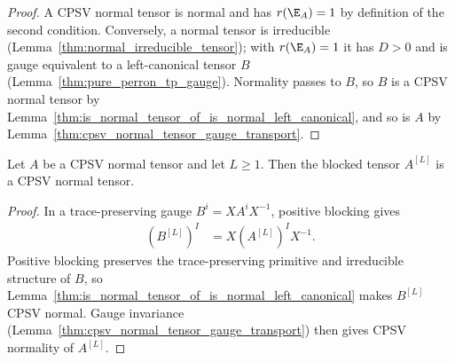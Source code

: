 \begin{proof}\leanok
    A CPSV normal tensor is normal and has $r(\E_A)=1$ by definition of the
    second condition. Conversely, a normal tensor is irreducible
    (Lemma~\ref{thm:normal_irreducible_tensor}); with $r(\E_A)=1$ it has
    $D>0$ and is gauge equivalent to a left-canonical tensor $B$
    (Lemma~\ref{thm:pure_perron_tp_gauge}). Normality passes to $B$, so $B$ is a
    CPSV normal tensor by
    Lemma~\ref{thm:is_normal_tensor_of_is_normal_left_canonical}, and so is $A$
    by Lemma~\ref{thm:cpsv_normal_tensor_gauge_transport}.
\end{proof}

\begin{lemma}
    \label{thm:cpsv_normal_tensor_positive_blocking}
    \leanok
    Let $A$ be a CPSV normal tensor and let $L\geq1$. Then the blocked tensor
    $A^{[L]}$ is a CPSV normal tensor.
\end{lemma}

\begin{proof}\leanok
    In a trace-preserving gauge $B^i=XA^iX^{-1}$, positive blocking gives
    \begin{align}
        (B^{[L]})^I
         & =X(A^{[L]})^IX^{-1}.
        \label{eq:cpsv_blocking_gauge}
    \end{align}
    Positive blocking preserves the trace-preserving primitive and irreducible
    structure of $B$, so Lemma~\ref{thm:is_normal_tensor_of_is_normal_left_canonical}
    makes $B^{[L]}$ CPSV normal. Gauge invariance
    (Lemma~\ref{thm:cpsv_normal_tensor_gauge_transport}) then gives CPSV
    normality of $A^{[L]}$.
\end{proof}

